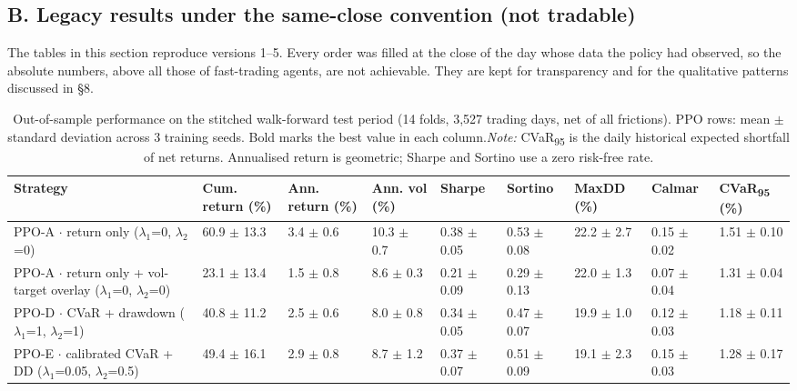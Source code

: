 \documentclass[11pt]{article}
\begin{document}
\subsection{B. Legacy results under the same-close convention (not tradable)}\label{b.-legacy-results-under-the-same-close-convention-not-tradable}

The tables in this section reproduce versions 1--5. Every order was filled at the close of the day whose data the policy had observed, so the absolute numbers, above all those of fast-trading agents, are not achievable. They are kept for transparency and for the qualitative patterns discussed in \S{}8.

\begin{table}[!htbp]
\centering\scriptsize
\caption{Out-of-sample performance on the stitched walk-forward test period (14 folds, 3,527 trading days, net of all frictions). PPO rows: mean $\pm$ standard deviation across 3 training seeds. Bold marks the best value in each column.\label{tab-main-real} \emph{Note:} CVaR\textsubscript{95} is the daily historical expected shortfall of net returns. Annualised return is geometric; Sharpe and Sortino use a zero risk-free rate.}
\begin{adjustbox}{max width=\linewidth}
\begin{tabular}{@{}lllllllll@{}}
\toprule
Strategy & Cum. return (\%) & Ann. return (\%) & Ann. vol (\%) & Sharpe & Sortino & MaxDD (\%) & Calmar & CVaR\textsubscript{95} (\%) \\
\midrule
PPO-A $\cdot$ return only {($\lambda_1$=0, $\lambda_2$=0)} & 60.9{ $\pm$ 13.3} & 3.4{ $\pm$ 0.6} & 10.3{ $\pm$ 0.7} & 0.38{ $\pm$ 0.05} & 0.53{ $\pm$ 0.08} & 22.2{ $\pm$ 2.7} & 0.15{ $\pm$ 0.02} & 1.51{ $\pm$ 0.10} \\
PPO-A $\cdot$ return only + vol-target overlay {($\lambda_1$=0, $\lambda_2$=0)} & 23.1{ $\pm$ 13.4} & 1.5{ $\pm$ 0.8} & 8.6{ $\pm$ 0.3} & 0.21{ $\pm$ 0.09} & 0.29{ $\pm$ 0.13} & 22.0{ $\pm$ 1.3} & 0.07{ $\pm$ 0.04} & 1.31{ $\pm$ 0.04} \\
PPO-D $\cdot$ CVaR + drawdown {($\lambda_1$=1, $\lambda_2$=1)} & 40.8{ $\pm$ 11.2} & 2.5{ $\pm$ 0.6} & 8.0{ $\pm$ 0.8} & 0.34{ $\pm$ 0.05} & 0.47{ $\pm$ 0.07} & 19.9{ $\pm$ 1.0} & 0.12{ $\pm$ 0.03} & 1.18{ $\pm$ 0.11} \\
PPO-E $\cdot$ calibrated CVaR + DD {($\lambda_1$=0.05, $\lambda_2$=0.5)} & 49.4{ $\pm$ 16.1} & 2.9{ $\pm$ 0.8} & 8.7{ $\pm$ 1.2} & 0.37{ $\pm$ 0.07} & 0.51{ $\pm$ 0.09} & 19.1{ $\pm$ 2.3} & 0.15{ $\pm$ 0.03} & 1.28{ $\pm$ 0.17} \\

\end{tabular}
\end{adjustbox}
\end{table}
\end{document}
